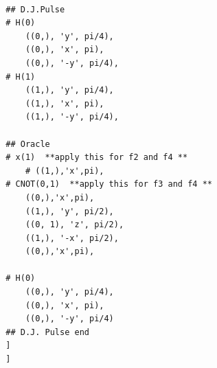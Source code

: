 \documentclass[11pt]{article}
\begin{document}
\begin{verbatim}
        
        ## D.J.Pulse
        # H(0)
            ((0,), 'y', pi/4),
            ((0,), 'x', pi),
            ((0,), '-y', pi/4),
        # H(1)
            ((1,), 'y', pi/4),
            ((1,), 'x', pi),
            ((1,), '-y', pi/4),
        
        ## Oracle
        # x(1)  **apply this for f2 and f4 **
            # ((1,),'x',pi),
        # CNOT(0,1)  **apply this for f3 and f4 **
            ((0,),'x',pi),
            ((1,), 'y', pi/2),
            ((0, 1), 'z', pi/2),
            ((1,), '-x', pi/2),
            ((0,),'x',pi),
        
        # H(0)
            ((0,), 'y', pi/4),
            ((0,), 'x', pi),
            ((0,), '-y', pi/4)
        ## D.J. Pulse end
        ]
        ]
\end{verbatim}
\end{document}
